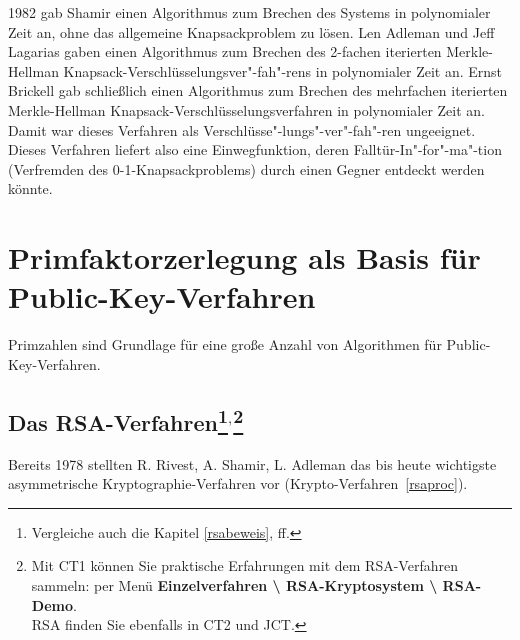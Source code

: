 \begin{refsegment}
1982 gab  Shamir \cite{Shamir1982} einen Algorithmus zum
Brechen des Systems in polynomialer  Zeit an, ohne das allgemeine
Knapsackproblem zu lösen. Len  Adleman
\cite{Adleman1982} und Jeff Lagarias 
\cite{Lagarias1983} gaben einen Algorithmus zum Brechen des 2-fachen
iterierten Merkle-Hellman Knapsack-Verschlüsselungsver"-fah"-rens in
polynomialer Zeit an. Ernst Brickell 
\cite{Brickell1985} gab schließlich einen Algorithmus zum Brechen des
mehrfachen iterierten Merkle-Hellman Knapsack-Ver\-schlüsse\-lungs\-ver\-fah\-ren in
polynomialer Zeit an. Damit war dieses Verfahren als
Verschlüsse"-lungs"-ver"-fah"-ren ungeeignet. Dieses Verfahren liefert also eine
Einwegfunktion, deren Falltür-In"-for"-ma"-tion (Verfremden des
0-1-Knapsackproblems) durch einen Gegner entdeckt werden könnte.



\clearpage
\section{Primfaktorzerlegung als Basis für Public-Key-Verfahren}

Primzahlen sind Grundlage für eine große Anzahl von Algorithmen für Public-Key-Verfahren.


\hypertarget{RSAVerfahren}{}
\subsection[Das RSA-Verfahren]{Das RSA-Verfahren\footnote{%
  Vergleiche auch die Kapitel \ref{rsabeweis}, ff.
}$^,$\footnote{%
Mit CT1 können Sie praktische Erfahrungen
mit dem RSA-Verfahren sammeln: per Menü {\bf Einzelverfahren
\textbackslash{} RSA-Kryptosystem \textbackslash{} RSA-Demo}.\\
RSA finden Sie ebenfalls in CT2 und JCT.
}
}
 \label{rsaverfahren}

Bereits 1978 stellten R.  Rivest,
 A. Shamir,   L. Adleman
\cite{rivest/shamir/adleman:1978} das bis heute wichtigste
asymmetrische Kryptographie-Verfahren vor (Krypto-Verfahren~\ref{rsaproc}).



\end{refsegment}
